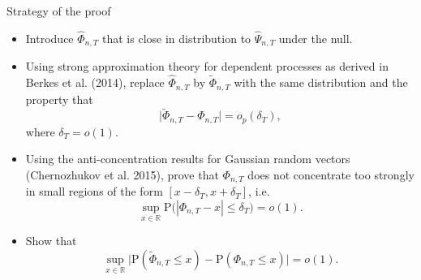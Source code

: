 \documentclass[10pt]{beamer}
\newcommand{\Prob}{\mathrm{P}}
\begin{document}
\begin{frame}{Strategy of the proof}
\begin{itemize}
\item Introduce $\widehat{\Phi}_{n, T}$ that is close in distribution to $\widehat{\Psi}_{n, T}$ under the null.\pause
\item Using strong approximation theory for dependent processes as derived in Berkes et al. (2014), replace $\widehat{\Phi}_{n, T}$ by $\widetilde{\Phi}_{n, T}$ with the same distribution and the property that 
\begin{equation*}\label{eq-theo-stat-strategy-step1}
\big| \widetilde{\Phi}_{n, T} - \Phi_{n, T} \big| = o_p(\delta_T),
\end{equation*}
where $\delta_T = o(1)$.\pause
\item Using the anti-concentration results for Gaussian random vectors (Chernozhukov et al. 2015), prove that $\Phi_{n, T}$ does not concentrate too strongly in small regions of the form $[x-\delta_T,x+\delta_T]$, i.e.
\begin{equation*}\label{eq-theo-stat-strategy-step2}
\sup_{x \in \mathbb{R}} \Prob \big( |\Phi_{n, T} - x| \le \delta_T \big) = o(1).
\end{equation*}\pause
\vspace{-2mm}
\item Show that 
\begin{equation*}\label{eq-theo-stat-strategy-claim}
\sup_{x \in \mathbb{R}} \big| \Prob(\widetilde{\Phi}_{n, T} \le x) - \Prob(\Phi_{n, T} \le x) \big| = o(1). 
\end{equation*}
\end{itemize}
\end{frame}
\end{document}
